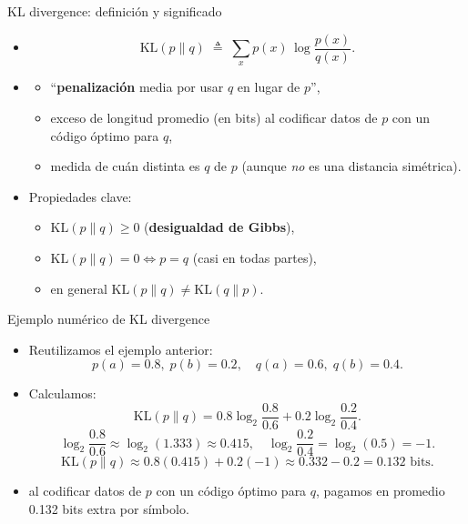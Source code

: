 \begin{frame}{KL divergence: definición y significado}
\begin{itemize}
  \item {}
  \[
    \mathrm{KL}(p\|q)
    \;\triangleq\;
    \sum_x p(x)\,\log\frac{p(x)}{q(x)}.
  \]
  \item {}
  \begin{itemize}
    \item “\textbf{penalización} media por usar \(q\) en lugar de \(p\)”,
    \item exceso de longitud promedio (en bits) al codificar datos de \(p\) con un código óptimo para \(q\),
    \item medida de cuán distinta es \(q\) de \(p\) (aunque \emph{no} es una distancia simétrica).
  \end{itemize}
  \item Propiedades clave:
  \begin{itemize}
    \item \(\mathrm{KL}(p\|q)\ge 0\) (\textbf{desigualdad de Gibbs}),
    \item \(\mathrm{KL}(p\|q)=0 \iff p=q\) (casi en todas partes),
    \item en general \(\mathrm{KL}(p\|q)\neq \mathrm{KL}(q\|p)\).
  \end{itemize}
\end{itemize}
\end{frame}

\begin{frame}{Ejemplo numérico de KL divergence}
\begin{itemize}
  \item Reutilizamos el ejemplo anterior:
  \[
    p(a)=0.8,\;p(b)=0.2,\quad
    q(a)=0.6,\;q(b)=0.4.
  \]
  \item Calculamos:
  \[
    \mathrm{KL}(p\|q)
    = 0.8\log_2\frac{0.8}{0.6} + 0.2\log_2\frac{0.2}{0.4}.
  \]
  \[
    \log_2\frac{0.8}{0.6} \approx \log_2(1.333)\approx 0.415,\quad
    \log_2\frac{0.2}{0.4} = \log_2(0.5)=-1.
  \]
  \[
    \mathrm{KL}(p\|q)
    \approx 0.8(0.415) + 0.2(-1)
    \approx 0.332 - 0.2
    = 0.132 \text{ bits.}
  \]
  \item {} al codificar datos de \(p\) con un código óptimo para \(q\), pagamos en promedio 0.132 bits extra por símbolo.
\end{itemize}
\end{frame}

